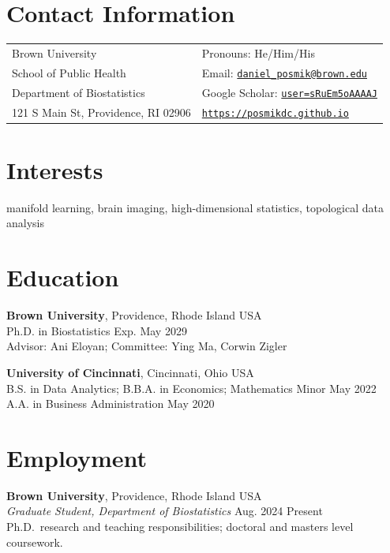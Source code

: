 \documentclass[margin,line]{res}
\begin{document}

\begin{resume}

\section{\sc Contact Information}
\vspace{.05in}
\begin{tabular}{@{}p{3in}p{4in}}
Brown University & {Pronouns: He/Him/His} \\
School of Public Health& {Email:} \href{mailto:daniel_posmik@brown.edu}{\texttt{daniel\_posmik@brown.edu}} \\
Department of Biostatistics & {Google Scholar:} \href{https://scholar.google.com/citations?user=sRuEm5oAAAAJ}{\texttt{user=sRuEm5oAAAAJ}} \\
121 S Main St, Providence, RI 02906 & \href{https://posmikdc.github.io}{\texttt{https://posmikdc.github.io}} \\
\end{tabular}

\section{\sc Interests}
manifold learning, brain imaging, high-dimensional statistics, topological data analysis

\section{\sc Education}
\textbf{Brown University}, Providence, Rhode Island USA \\
Ph.D. in Biostatistics \hfill Exp. May 2029 \\
Advisor: Ani Eloyan; Committee: Ying Ma, Corwin Zigler 

\textbf{University of Cincinnati}, Cincinnati, Ohio USA \\
B.S. in Data Analytics; B.B.A. in Economics; Mathematics Minor \hfill May 2022 \\
A.A. in Business Administration \hfill May 2020

\section{\sc Employment}

\textbf{Brown University}, Providence, Rhode Island USA \\[1mm]
\textit{Graduate Student, Department of Biostatistics} \hfill Aug. 2024{ \textemdash } Present \\
Ph.D.\ research and teaching responsibilities; doctoral and masters level coursework.


\end{resume}
\end{document}
